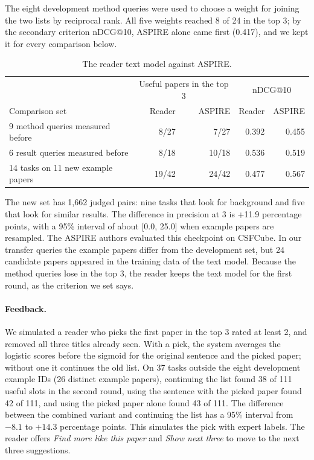 \documentclass[11pt,a4paper]{article}
\begin{document}
The eight development method queries were used to choose a weight for joining the two lists by reciprocal rank. All five weights reached 8 of 24 in the top 3; by the secondary criterion nDCG@10, ASPIRE alone came first (0.417), and we kept it for every comparison below.
\begin{table}[htbp]\centering\small
\begin{tabular}{@{}lrrrr@{}}\toprule
 & \multicolumn{2}{c}{Useful papers in the top 3} & \multicolumn{2}{c}{nDCG@10}\\
Comparison set & Reader & ASPIRE & Reader & ASPIRE\\\midrule
9 method queries measured before & 8/27 & 7/27 & 0.392 & 0.455\\
6 result queries measured before & 8/18 & 10/18 & 0.536 & 0.519\\
14 tasks on 11 new example papers & 19/42 & 24/42 & 0.477 & 0.567\\\bottomrule
\end{tabular}\caption{The reader text model against ASPIRE.}\label{tab:aspire}\end{table}
The new set has 1,662 judged pairs: nine tasks that look for background and five that look for similar results. The difference in precision at 3 is +11.9 percentage points, with a 95\% interval of about [0.0, 25.0] when example papers are resampled. The ASPIRE authors evaluated this checkpoint on CSFCube. In our transfer queries the example papers differ from the development set, but 24 candidate papers appeared in the training data of the text model. Because the method queries lose in the top 3, the reader keeps the text model for the first round, as the criterion we set says.

\paragraph{Feedback.} We simulated a reader who picks the first paper in the top 3 rated at least 2, and removed all three titles already seen. With a pick, the system averages the logistic scores before the sigmoid for the original sentence and the picked paper; without one it continues the old list. On 37 tasks outside the eight development example IDs (26 distinct example papers), continuing the list found 38 of 111 useful slots in the second round, using the sentence with the picked paper found 42 of 111, and using the picked paper alone found 43 of 111. The difference between the combined variant and continuing the list has a 95\% interval from $-8.1$ to $+14.3$ percentage points. This simulates the pick with expert labels. The reader offers \textit{Find more like this paper} and \textit{Show next three} to move to the next three suggestions.
\end{document}
